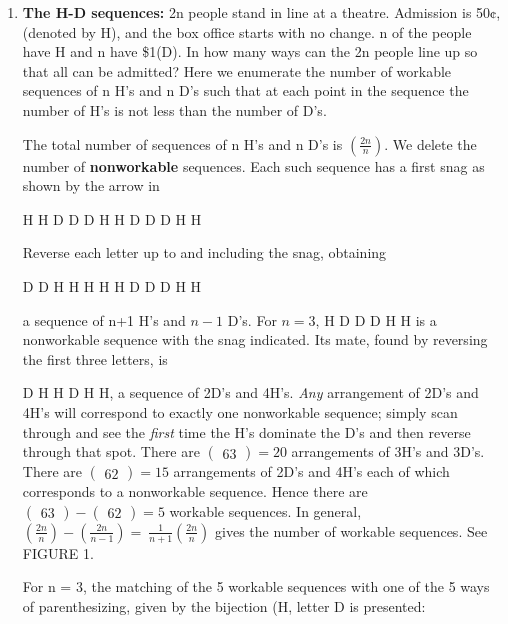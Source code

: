 \documentclass[10pt,letter]{article}
\begin{document}
\begin{enumerate}
\def\labelenumi{\Roman{enumi}.}

\item
  \textbf{The H-D sequences:} 2n people stand in line at a theatre.
  Admission is 50¢, (denoted by H), and the box office starts with no
  change. n of the people have H and n have \$1(D). In how many ways can
  the 2n people line up so that all can be admitted? Here we enumerate
  the number of workable sequences of n H's and n D's such that at each
  point in the sequence the number of H's is not less than the number of
  D's.

The total number of sequences of n H's and n D's is
  \(\left( \frac{2n}{n} \right)\). We delete the number of
  \textbf{nonworkable} sequences. Each such sequence has a first snag as
  shown by the arrow in

H H D D D H H D D D H H

Reverse each letter up to and including the snag, obtaining

D D H H H H H D D D H H

a sequence of n+1 H's and \(n - 1\) D's. For \(n = 3\), H D D D H H is
  a nonworkable sequence with the snag indicated. Its mate, found by
  reversing the first three letters, is

D H H D H H, a sequence of 2D's and 4H's. \emph{Any} arrangement of
  2D's and 4H's will correspond to exactly one nonworkable sequence;
  simply scan through and see the \emph{first} time the H's dominate the
  D's and then reverse through that spot. There are \(

\begin{pmatrix}
  6 
  3 
  \end{pmatrix}
 = 20\) arrangements of 3H's and 3D's. There are
  \(

\begin{pmatrix}
  6 
  2 
  \end{pmatrix}
 = 15\) arrangements of 2D's and 4H's each of which
  corresponds to a nonworkable sequence. Hence there are
  \(

\begin{pmatrix}
  6 
  3 
  \end{pmatrix}
 -

\begin{pmatrix}
  6 
  2 
  \end{pmatrix}
 = 5\) workable sequences. In general,
  \(\left( \frac{2n}{n} \right) - \left( \frac{2n}{n - 1} \right) = \ \frac{1}{n + 1}\left( \frac{2n}{n} \right)\)
  gives the number of workable sequences. See FIGURE 1.

For n = 3, the matching of the 5 workable sequences with one of the 5
  ways of parenthesizing, given by the bijection (H, letter D is
  presented:

\end{enumerate}
\end{document}

